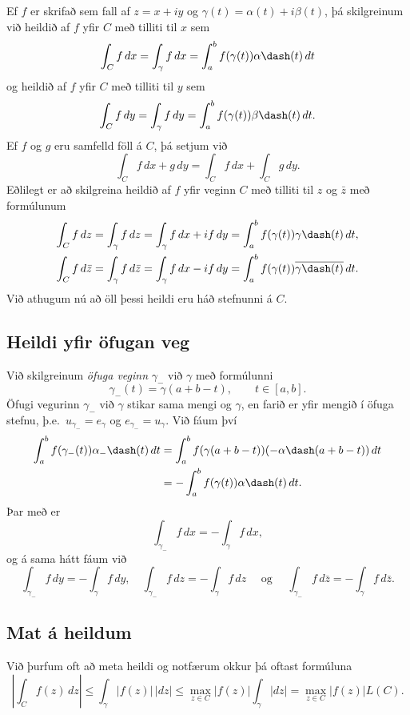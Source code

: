 Ef $f$ er skrifað sem fall af $z=x+iy$ og
$\gamma(t)=\alpha(t)+i\beta(t)$, þá skilgreinum við heildið af  $f$
yfir $C$ með tilliti til $x$ sem 
 $$\int_C f \, dx =\int_\gamma f\, dx = \int_a\sp b f(\gamma(t))
\alpha\dash(t) \, dt
 $$
og heildið af $f$ yfir $C$  með tilliti til $y$ sem
 $$\int_C f \, dy =\int_\gamma f\, dy = \int_a\sp b f(\gamma(t))
\beta\dash(t) \, dt.
 $$
Ef $f$ og $g$ eru samfelld föll á $C$, þá setjum við 
 $$\int_C f\, dx +g \, dy = \int_C f\, dx + \int_C g\, dy.
 $$
Eðlilegt er að skilgreina heildið af $f$ yfir veginn
$C$ með tilliti til $z$ og $\bar z$ með formúlunum
\begin{gather*}
\int_C f\, dz =\int_\gamma f\, dz= \int_\gamma f\, dx +if\, dy =
\int_a^bf(\gamma(t))\gamma\dash(t) \, dt,\\
\int_C f\, d\bar z =\int_\gamma f\, d\bar z= \int_\gamma
f\, dx -if\, dy = 
\int_a^bf(\gamma(t))\overline{\gamma\dash(t)} \, dt.
\end{gather*}
Við athugum nú að öll þessi heildi eru háð stefnunni á $C$.  


\subsection*{Heildi yfir öfugan veg}

Við
skilgreinum {\it öfuga veginn}
$\gamma_-$ við $\gamma$ með formúlunni 
 $$\gamma_-(t)=\gamma(a+b-t), \qquad t\in [a,b].
 $$
Öfugi vegurinn ${\gamma}_-$ við ${\gamma}$ stikar sama mengi og
${\gamma}$, en farið er yfir mengið í öfuga stefnu,
þ.e.~$u_{\gamma_-}=e_{\gamma}$ og $e_{\gamma_-}=u_{\gamma}$.
Við fáum því     
\begin{align*}
\int_a\sp b f(\gamma_-(t))\alpha_-\dash(t) \, dt &=
\int_a\sp b f(\gamma(a+b-t))(-\alpha\dash(a+b-t)) \, dt \\
&=
-\int_a\sp b f(\gamma(t))\alpha\dash(t) \, dt.
\end{align*}
Þar með er
 $$\int_{\gamma_-}f\, dx = -\int_\gamma f\, dx,
 $$
og á sama hátt fáum við 
 $$
\int_{\gamma_-}f\, dy = -\int_\gamma f\, dy, \quad 
\int_{\gamma_-}f\, dz = -\int_\gamma f\, dz \quad \text{ og } \quad
\int_{\gamma_-}f\, d\bar z = -\int_\gamma f\, d\bar z.
 $$


\subsection*{Mat á heildum}

Við þurfum oft  að meta heildi og notfærum okkur þá
oftast formúluna
 $$
| \int_C f(z)\, dz| \leq \int_\gamma |f(z)|\, |dz|\leq \max_{z\in C}
|f(z)| \int_\gamma |dz|= \max_{z\in C}|f(z)|L(C).
 $$


